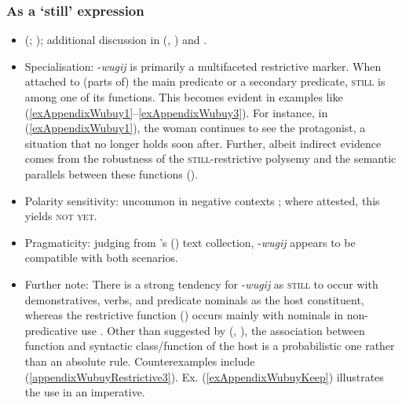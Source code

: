 \subsubsection{As a \lq{}still\rq{} expression}
\begin{itemize}
	\item \citeauthor{Heath1982} (\citeyear[238, 303]{Heath1982}; \citeyear[217, 320, 335, 447–448]{Heath1984}); additional discussion in \citeauthor{vanBaar1991} (\citeyear{vanBaar1991}, \citeyear[111]{vanBaar1997}) and \textcite{SchultzeBerndt2002}.
	\item Specialisation: -\textit{wugij} is primarily a multifaceted restrictive marker. When attached to (parts of) the main predicate or a secondary predicate, \textsc{still} is among one of its functions. This becomes evident in examples like (\ref{exAppendixWubuy1}–\ref{exAppendixWubuy3}). For instance, in (\ref{exAppendixWubuy1}), the woman continues to see the protagonist, a situation that no longer holds soon after. Further, albeit indirect evidence comes from the robustness of the \textsc{still}-restrictive polysemy and the semantic parallels between these functions ().
	\item Polarity sensitivity: uncommon in negative contexts \parencite[448]{Heath1984}; where attested, this yields \textsc{not yet}.
	\item Pragmaticity: judging from \citeauthor{Heath1980}'s (\citeyear{Heath1980}) text collection, \mbox{-\textit{wugij}} appears to be compatible with both scenarios.
	\item Further note: There is a strong tendency for \mbox{-\textit{wugij}} as \textsc{still} to occur with demonstratives, verbs, and predicate nominals as the host constituent, whereas the restrictive function () occurs mainly with nominals in non-predicative use \parencite[217, 447]{Heath1984}. Other than suggested by \citeauthor{vanBaar1991} (\citeyear{vanBaar1991}, \citeyear[111]{vanBaar1997}), the association between function and syntactic class/function of the host is a probabilistic one rather than an absolute rule. Counterexamples include (\ref{appendixWubuyRestrictive3}). Ex. (\ref{exAppendixWubuyKeep}) illustrates the use in an imperative.
	
\end{itemize}
